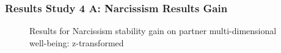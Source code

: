 \documentclass[
  singlecolumn]{article}
\begin{document}
\subsubsection{Results Study 4 A: Narcissism Results
Gain}\label{results-study-4-a-narcissism-results-gain}

\begin{figure}


\caption{\label{fig-results-narcissism-gain}Results for Narcissism
stability gain on partner multi-dimensional well-being: z-transformed}

\end{figure}%

\newpage{}
\end{document}
